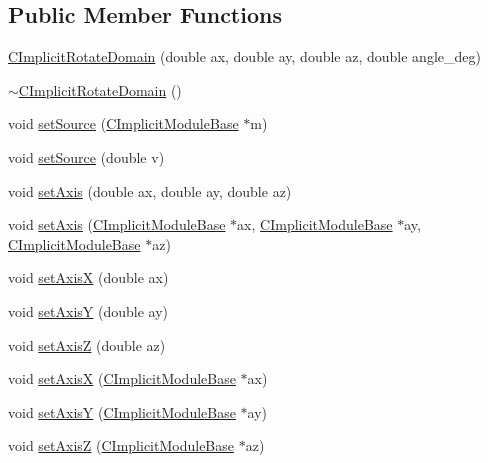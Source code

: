 \subsection*{Public Member Functions}
\begin{DoxyCompactItemize}
\item 
\hyperlink{classanl_1_1CImplicitRotateDomain_a90c53e09c2018dc921a1ae128644bb7b}{CImplicitRotateDomain} (double ax, double ay, double az, double angle\_\-deg)
\item 
\hyperlink{classanl_1_1CImplicitRotateDomain_a1b3be6e3c993c08310dffb8327cfbd3d}{$\sim$CImplicitRotateDomain} ()
\item 
void \hyperlink{classanl_1_1CImplicitRotateDomain_a9ce19d8da4b914036a7613441f19869b}{setSource} (\hyperlink{classanl_1_1CImplicitModuleBase}{CImplicitModuleBase} $\ast$m)
\item 
void \hyperlink{classanl_1_1CImplicitRotateDomain_a32b3a3eee640bf2e3c10039a8c44fb0e}{setSource} (double v)
\item 
void \hyperlink{classanl_1_1CImplicitRotateDomain_ae30695e1ea7d8b089bb446c175f57e4f}{setAxis} (double ax, double ay, double az)
\item 
void \hyperlink{classanl_1_1CImplicitRotateDomain_a5e77155db0000d4f97a0c63fb658af10}{setAxis} (\hyperlink{classanl_1_1CImplicitModuleBase}{CImplicitModuleBase} $\ast$ax, \hyperlink{classanl_1_1CImplicitModuleBase}{CImplicitModuleBase} $\ast$ay, \hyperlink{classanl_1_1CImplicitModuleBase}{CImplicitModuleBase} $\ast$az)
\item 
void \hyperlink{classanl_1_1CImplicitRotateDomain_aab99f48401bf6544843f22ffbde25d96}{setAxisX} (double ax)
\item 
void \hyperlink{classanl_1_1CImplicitRotateDomain_a45fd5e71bdd3506a578426af5733e3a8}{setAxisY} (double ay)
\item 
void \hyperlink{classanl_1_1CImplicitRotateDomain_ae6e7a668b829151e981beb38d13e7224}{setAxisZ} (double az)
\item 
void \hyperlink{classanl_1_1CImplicitRotateDomain_a1ceef542b5dce3e249ca4a153b74a742}{setAxisX} (\hyperlink{classanl_1_1CImplicitModuleBase}{CImplicitModuleBase} $\ast$ax)
\item 
void \hyperlink{classanl_1_1CImplicitRotateDomain_a5c9d2605bad361140c5f84e6e51cf0e9}{setAxisY} (\hyperlink{classanl_1_1CImplicitModuleBase}{CImplicitModuleBase} $\ast$ay)
\item 
void \hyperlink{classanl_1_1CImplicitRotateDomain_ab092ff91ebd67fa749000e36b2412f98}{setAxisZ} (\hyperlink{classanl_1_1CImplicitModuleBase}{CImplicitModuleBase} $\ast$az)

\end{DoxyCompactItemize}
